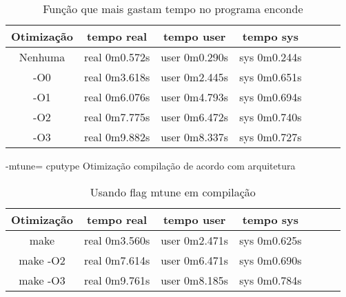 \documentclass[10pt,a4paper]{article}
\begin{document}
\begin{table}[h!]
  \caption{Função que mais gastam tempo no programa enconde}
\begin{center}
  \begin{tabular}{ccccccc}

Otimização& tempo real& tempo user& tempo sys\\
\hline 
Nenhuma  &  real	0m0.572s & user	0m0.290s& sys	0m0.244s\\

-O0&
real	0m3.618s&
user	0m2.445s&
sys	0m0.651s\\

-O1&
real	0m6.076s&
user	0m4.793s&
sys	0m0.694s\\

 -O2&
real	0m7.775s&
user	0m6.472s&
sys	0m0.740s\\

-O3&
real	0m9.882s&
user	0m8.337s&
sys	0m0.727s\\

 \end{tabular}
\end{center}
\end{table}

-mtune= cpu\underline{}type 
Otimização compilação de acordo com arquitetura

\begin{table}[h!]
  \caption{Usando flag mtune em compilação}
\begin{center}
  \begin{tabular}{ccccccc}
Otimização& tempo real& tempo user& tempo sys\\
\hline
make &
real	0m3.560s&
user	0m2.471s&
sys	0m0.625s\\

make -O2&
real	0m7.614s&
user	0m6.471s&
sys	0m0.690s\\

make -O3&
real	0m9.761s&
user	0m8.185s&
sys	0m0.784s


 \end{tabular}
\end{center}
\end{table}


\end{document}
